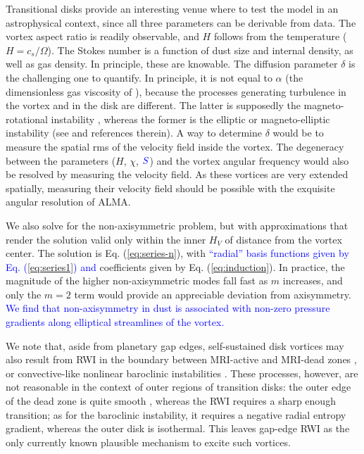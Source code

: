 \documentclass[apj]{emulateapj}
\def\blue#1{\textcolor{blue}{ #1}}
\newcommand{\Eq}[1]{Eq. (\ref{#1})}
\newcommand{\eq}[1]{\Eq{#1}}
\begin{document}
Transitional disks provide an interesting venue where to test the
model in an astrophysical context, since all three parameters can be
derivable from data. The vortex aspect ratio is readily observable,
and $H$ follows from the temperature ($H=c_s/\varOmega$). The Stokes number is a function of
dust size and internal density, as well as gas density. In principle,
these are knowable. The diffusion parameter $\delta$ is the
challenging one to quantify. In principle, it is not equal to
$\alpha$ (the dimensionless gas viscosity of
\citealt{Shakura-Sunyaev73}), because the processes generating turbulence in the
vortex and in the disk are different. The latter is supposedly the
magneto-rotational instability \citep[MRI,][]{Balbus-Hawley91}, whereas the former is the elliptic or
magneto-elliptic instability (see \citealt{Lyra13} and references
therein). A way to determine $\delta$ would be to measure the spatial rms of
the velocity field inside the vortex. The degeneracy between the
parameters ($H$, $\chi$, $\blue{S}$) and the vortex angular frequency
would also be resolved by measuring the velocity field. As these
vortices are very extended spatially, measuring their velocity field
should be possible with the exquisite angular resolution of ALMA.

We also solve for the non-axisymmetric problem, but with
approximations that render the solution valid only within 
the inner $H_V$ of distance from the vortex center. The solution is
\eq{eq:series-n}, with \blue{``radial'' basis functions given by
\eq{eq:series1} and} coefficients given by \eq{eq:induction}. In practice, the magnitude
of the higher non-axisymmetric modes fall fast as $m$ increases, and 
only the $m=2$ term would provide an appreciable deviation from
axisymmetry. \blue{We find that non-axisymmetry in dust 
is associated with non-zero pressure gradients along elliptical streamlines of the vortex.}

We note that, aside from planetary gap edges, self-sustained disk
vortices may also result from RWI in the boundary between MRI-active and MRI-dead zones \citep{Varniere-Tagger06,Lyra08,Lyra09a,Lyra-MacLow12}, or
convective-like nonlinear baroclinic instabilities \citep{Klahr-Bodenheimer03,Klahr04,Petersen07a,Petersen07b,Lesur-Papaloizou10,Lyra-Klahr11,Raettig13}. 
These processes, however, are not reasonable in the context of outer
regions of transition disks: the outer edge of the dead zone is quite smooth
\citep{Dzyurkevich13,Landry13}, whereas the RWI requires a 
sharp enough transition; as for the baroclinic instability, it
requires a negative radial entropy gradient, whereas the outer disk is
isothermal. This leaves gap-edge RWI as the only currently known plausible mechanism to excite such vortices. 
\end{document}
